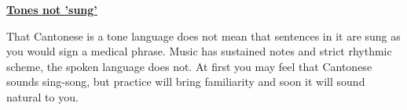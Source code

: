 \noindent\underline{\textbf{Tones not 'sung'}}

That Cantonese is a tone language does not mean that sentences in it are sung as you would sign a medical phrase. Music has sustained notes and strict rhythmic scheme, the spoken language does not. At first you may feel that Cantonese sounds sing-song, but practice will bring familiarity and soon it will sound natural to you.
